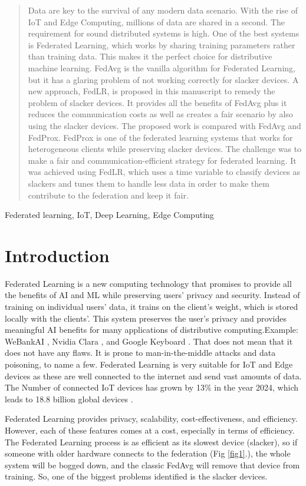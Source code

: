 \documentclass[conference]{IEEEtran}
\begin{document}
\begin{abstract}
Data are key to the survival of any modern data scenario. With the rise of IoT and Edge Computing, millions of data are shared in a second. The requirement for sound distributed systems is high. One of the best systems is Federated Learning, which works by sharing training parameters rather than training data. This makes it the perfect choice for distributive machine learning. FedAvg is the vanilla algorithm for Federated Learning, but it has a glaring problem of not working correctly for slacker devices. A new approach, FedLR, is proposed in this manuscript to remedy the problem of slacker devices. It provides all the benefits of FedAvg plus it reduces the communication costs as well as creates a fair scenario by also using the slacker devices. The proposed work is compared with FedAvg and FedProx. FedProx is one of the federated learning systems that works for heterogeneous clients while preserving slacker devices. The challenge was to make a fair and communication-efficient strategy for federated learning. It was achieved using FedLR, which uses a time variable to classify devices as slackers and tunes them to handle less data in order to make them contribute to the federation and keep it fair.
\end{abstract}
\begin{IEEEkeywords}
Federated learning, IoT, Deep Learning, Edge Computing
\end{IEEEkeywords}

\IEEEpeerreviewmaketitle



\section{Introduction}
Federated Learning is a new computing technology that promises to provide all the benefits of AI and ML while preserving users' privacy and security. Instead of training on individual users' data, it trains on the client's weight, which is stored locally with the clients'. This system preserves the user's privacy and provides meaningful AI benefits for many applications of distributive computing.Example: WeBankAI \cite{liu2021fate}, Nvidia Clara \cite{nvidia}, and Google Keyboard \cite{yang2018applied}. That does not mean that it does not have any flaws. It is prone to man-in-the-middle attacks and data poisoning, to name a few. Federated Learning is very suitable for IoT and Edge devices as these are well connected to the internet and send vast amounts of data. The Number of connected IoT devices has grown by 13\% in the year 2024, which leads to 18.8 billion global devices \cite{iotana}.\par
Federated Learning provides privacy, scalability, cost-effectiveness, and efficiency. However, each of these features comes at a cost, especially in terms of efficiency. The Federated Learning process is as efficient as its slowest device (slacker), so if someone with older hardware connects to the federation (Fig \ref{fig1}.), the whole system will be bogged down, and the classic FedAvg \cite{mcmahan2017communication} will remove that device from training. So, one of the biggest problems identified is the slacker devices. 
\end{document}
